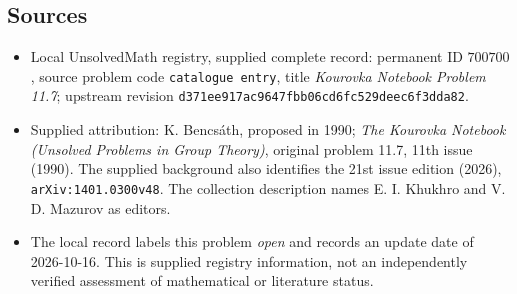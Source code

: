 \documentclass[11pt]{article}
\begin{document}
\subsection{Sources}
\begin{itemize}
\item Local UnsolvedMath registry, supplied complete record: permanent ID \(700700\), source problem code \texttt{catalogue entry}, title \emph{Kourovka Notebook Problem 11.7}; upstream revision \texttt{d371ee917ac9647fbb06cd6fc529deec6f3dda82}.
\item Supplied attribution: K. Bencs\'ath, proposed in 1990; \emph{The Kourovka Notebook (Unsolved Problems in Group Theory)}, original problem 11.7, 11th issue (1990). The supplied background also identifies the 21st issue edition (2026), \texttt{arXiv:1401.0300v48}. The collection description names E. I. Khukhro and V. D. Mazurov as editors.
\item The local record labels this problem \emph{open} and records an update date of 2026-10-16. This is supplied registry information, not an independently verified assessment of mathematical or literature status.
\end{itemize}
\end{document}

